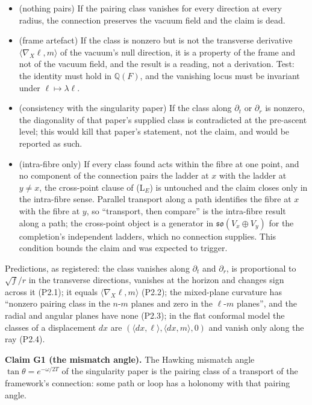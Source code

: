 \documentclass[11pt]{article}
\theoremstyle{definition}
\theoremstyle{plain}
\providecommand{\Q}{}\renewcommand{\Q}{\mathbb{Q}}
\providecommand{\so}{}\renewcommand{\so}{\mathfrak{so}}
\providecommand{\ip}{}\renewcommand{\ip}[2]{\langle #1, #2\rangle}
\begin{document}
\begin{itemize}
\item[K2.1] (nothing pairs) If the pairing class vanishes for every direction at every radius, the connection preserves the vacuum field and the claim is dead.
\item[K2.2] (frame artefact) If the class is nonzero but is not the transverse derivative $\ip{\nabla_X \ell}{m}$ of the vacuum's null direction, it is a property of the frame and not of the vacuum field, and the result is a reading, not a derivation. Test: the identity must hold in $\Q(F)$, and the vanishing locus must be invariant under $\ell \mapsto \lambda\ell$.
\item[K2.3] (consistency with the singularity paper) If the class along $\partial_t$ or $\partial_r$ is nonzero, the diagonality of that paper's supplied class \cite[Prop.~7.31, Thm.~C.8]{ButlerT5} is contradicted at the pre-ascent level; this would kill that paper's statement, not the claim, and would be reported as such.
\item[K2.4] (intra-fibre only) If every class found acts within the fibre at one point, and no component of the connection pairs the ladder at $x$ with the ladder at $y \neq x$, the cross-point clause of (L$_E$) is untouched and the claim closes only in the intra-fibre sense. Parallel transport along a path identifies the fibre at $x$ with the fibre at $y$, so ``transport, then compare'' is the intra-fibre result along a path; the cross-point object is a generator in $\so(V_{x} \oplus V_{y})$ for the completion's independent ladders, which no connection supplies. This condition bounds the claim and was expected to trigger.
\end{itemize}
Predictions, as registered: the class vanishes along $\partial_t$ and $\partial_r$, is proportional to $\sqrt f/r$ in the transverse directions, vanishes at the horizon and changes sign across it (P2.1); it equals $\ip{\nabla_X\ell}{m}$ (P2.2); the mixed-plane curvature has ``nonzero pairing class in the $n$-$m$ planes and zero in the $\ell$-$m$ planes'', and the radial and angular planes have none (P2.3); in the flat conformal model the classes of a displacement $dx$ are $(\ip{dx}{\ell}, \ip{dx}{m}, 0)$ and vanish only along the ray (P2.4).

\label{c:note.pairing.setting-two-claims-kill-conditions-fixed-3}
\textbf{Claim G1 (the mismatch angle).} The Hawking mismatch angle $\tan\theta = e^{-\omega/2T}$ of the singularity paper \cite[Lem.~7.2, Thm.~7.27]{ButlerT5} is the pairing class of a transport of the framework's connection: some path or loop has a holonomy with that pairing angle.
\end{document}
